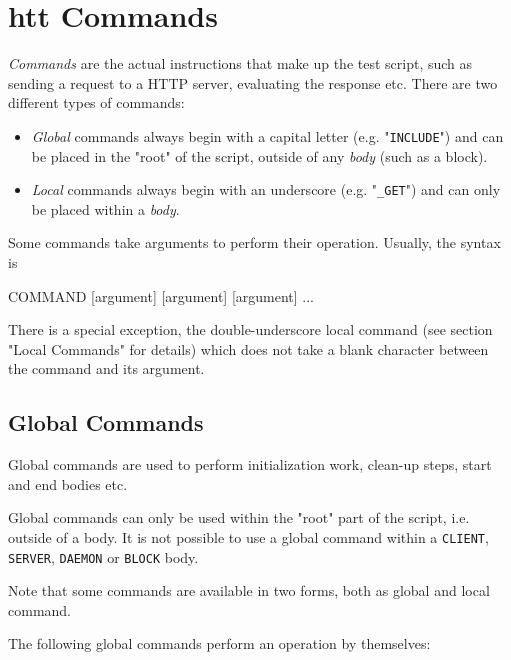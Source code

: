 \chapter{htt Commands}
\label{chap:commands}

\textit{Commands} are the actual instructions that make up the test script, such as 
sending a request to a HTTP server, evaluating the response etc. There are two 
different types of commands:

\begin{itemize}
\item \textit{Global} commands always begin with a capital letter (e.g. "\texttt{INCLUDE}") and 
      can be placed in the "root" of the script, outside of any \textit{body} (such as a block).
\item \textit{Local} commands always begin with an underscore (e.g. "\texttt{\_GET}") and 
      can only be placed within a \textit{body}.
\end{itemize}

Some commands take arguments to perform their operation. Usually, the syntax is

\begin{usplisting}
    COMMAND [argument] [argument] [argument] ...
\end{usplisting}

There is a special exception, the double-underscore local command (see section 
"Local Commands" for details) which does not take a blank character between the 
command and its argument.


\newpage
\section{Global Commands}
\label{chap:globalCommands}

Global commands are used to perform initialization work, clean-up steps, 
start and end bodies etc.

Global commands can only be used within the "root" part of the script, 
i.e. outside of a body. It is not possible to use a global command within 
a \texttt{CLIENT}, \texttt{SERVER}, \texttt{DAEMON} or \texttt{BLOCK} body. 

Note that some commands are available in two forms, both as global 
and local command.

The following global commands perform an operation by themselves:


